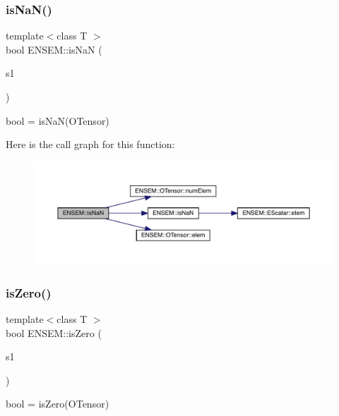 \subsubsection{\texorpdfstring{isNaN()}{isNaN()}}
{\footnotesize\ttfamily template$<$class T $>$ \\
bool E\+N\+S\+E\+M\+::is\+NaN (\begin{DoxyParamCaption}\item[{const \mbox{\hyperlink{classENSEM_1_1OTensor}{O\+Tensor}}$<$ T $>$ \&}]{s1 }\end{DoxyParamCaption})}



bool = is\+Na\+N(\+O\+Tensor) 

Here is the call graph for this function\+:\nopagebreak
\begin{figure}[H]
\begin{center}
\leavevmode
\includegraphics[width=350pt]{de/d87/group__obstensor_ga24d19fade61896ac0c88639bd7b00b5a_cgraph}
\end{center}
\end{figure}
\mbox{\label{group__obstensor_ga9520741647696623fb9f0d8398f50568}} 
\subsubsection{\texorpdfstring{isZero()}{isZero()}}
{\footnotesize\ttfamily template$<$class T $>$ \\
bool E\+N\+S\+E\+M\+::is\+Zero (\begin{DoxyParamCaption}\item[{const \mbox{\hyperlink{classENSEM_1_1OTensor}{O\+Tensor}}$<$ T $>$ \&}]{s1 }\end{DoxyParamCaption})}



bool = is\+Zero(\+O\+Tensor) 

